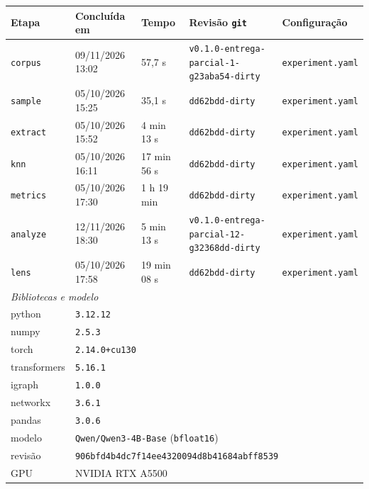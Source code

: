 \footnotesize
\begin{tabular}{lllll}
\toprule
Etapa & Concluída em & Tempo & Revisão \texttt{git} & Configuração \\
\midrule
\texttt{corpus} & 09/11/2026 13:02 & 57,7 s & \texttt{v0.1.0-{}entrega-{}parcial-{}1-{}g23aba54-{}dirty} & \texttt{experiment.yaml} \\
\texttt{sample} & 05/10/2026 15:25 & 35,1 s & \texttt{dd62bdd-{}dirty} & \texttt{experiment.yaml} \\
\texttt{extract} & 05/10/2026 15:52 & 4 min 13 s & \texttt{dd62bdd-{}dirty} & \texttt{experiment.yaml} \\
\texttt{knn} & 05/10/2026 16:11 & 17 min 56 s & \texttt{dd62bdd-{}dirty} & \texttt{experiment.yaml} \\
\texttt{metrics} & 05/10/2026 17:30 & 1 h 19 min & \texttt{dd62bdd-{}dirty} & \texttt{experiment.yaml} \\
\texttt{analyze} & 12/11/2026 18:30 & 5 min 13 s & \texttt{v0.1.0-{}entrega-{}parcial-{}12-{}g32368dd-{}dirty} & \texttt{experiment.yaml} \\
\texttt{lens} & 05/10/2026 17:58 & 19 min 08 s & \texttt{dd62bdd-{}dirty} & \texttt{experiment.yaml} \\
\midrule
\multicolumn{5}{l}{\textit{Bibliotecas e modelo}} \\
python & \multicolumn{4}{l}{\texttt{3.12.12}} \\
numpy & \multicolumn{4}{l}{\texttt{2.5.3}} \\
torch & \multicolumn{4}{l}{\texttt{2.14.0+cu130}} \\
transformers & \multicolumn{4}{l}{\texttt{5.16.1}} \\
igraph & \multicolumn{4}{l}{\texttt{1.0.0}} \\
networkx & \multicolumn{4}{l}{\texttt{3.6.1}} \\
pandas & \multicolumn{4}{l}{\texttt{3.0.6}} \\
modelo & \multicolumn{4}{l}{\texttt{Qwen/Qwen3-{}4B-{}Base} (\texttt{bfloat16})} \\
revisão & \multicolumn{4}{l}{\texttt{906bfd4b4dc7f14ee4320094d8b41684abff8539}} \\
GPU & \multicolumn{4}{l}{NVIDIA RTX A5500} \\
\bottomrule
\end{tabular}

